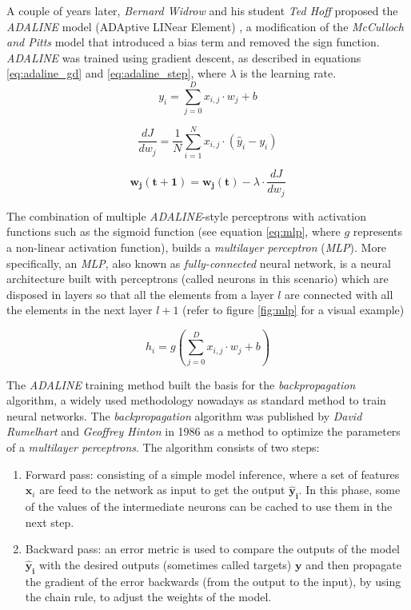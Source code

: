  A couple of years later, \textit{Bernard Widrow} and his student \textit{Ted Hoff} proposed the \textit{ADALINE} model (ADAptive LINear Element) \cite{widrow1960}, a modification of the \textit{McCulloch and Pitts} model that introduced a bias term and removed the sign function. \textit{ADALINE} was trained using gradient descent, as described in equations \ref{eq:adaline_gd} and \ref{eq:adaline_step}, where $\lambda$ is the learning rate. 
\begin{equation}
\label{eq:adaline_fp}
y_i = \sum_{j=0}^{D} x_{i,j} \cdot w_{j} + b
\end{equation}

\begin{equation}
\label{eq:adaline_gd}
\frac{dJ}{d{w_j}} = \frac{1}{N} \sum_{i=1}^{N} x_{i,j} \cdot(\hat{y}_i - y_i)
\end{equation}

\begin{equation}
\label{eq:adaline_step}
\mathbf{w_j(t+1)} = \mathbf{w_j(t)} - \lambda \cdot \frac{dJ}{d{w_j}}
\end{equation}


 The combination of multiple \textit{ADALINE}-style perceptrons with activation functions such as the sigmoid function (see equation \ref{eq:mlp}, where $g$ represents a non-linear activation function), builds a \textit{multilayer perceptron} (\textit{MLP}). More specifically, an \textit{MLP}, also known as \textit{fully-connected} neural network, is a neural architecture built with perceptrons (called neurons in this scenario) which are disposed in layers so that all the elements from a layer $l$ are connected with all the elements in the next layer $l+1$ (refer to figure \ref{fig:mlp} for a visual example)
 
 
 \begin{equation}
 \label{eq:mlp}
 h_i = g\left(\sum_{j=0}^{D} x_{i,j} \cdot w_{j} + b\right)
 \end{equation}
 
 The \textit{ADALINE} training method built the basis for the \textit{backpropagation} algorithm, a widely used methodology nowadays as standard method to train neural networks. The \textit{backpropagation} algorithm \cite{hinton1986} was published by \textit{David Rumelhart} and \textit{Geoffrey Hinton} in 1986 as a method to optimize the parameters of a \textit{multilayer perceptrons}. The algorithm consists of two steps:

\begin{enumerate}
\item Forward pass: consisting of a simple model inference, where a set of features $\mathbf{x}_i$ are feed to the network as input to get the output $\mathbf{\hat{y}_i}$. In this phase, some of the values of the intermediate neurons can be cached to use them in the next step.

\item Backward pass: an error metric is used to compare the outputs of the model $\mathbf{\hat{y}_i}$ with the desired outputs (sometimes called targets) $\mathbf{y}$ and then propagate the gradient of the error backwards (from the output to the input), by using the chain rule, to adjust the weights of the model. 
\end{enumerate}


